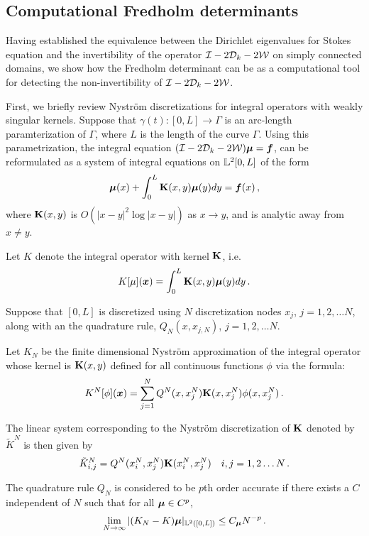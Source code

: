 \subsection{Computational Fredholm determinants}
Having established the equivalence between the Dirichlet eigenvalues
for Stokes equation and the invertibility of
the operator $\mathcal I - 2{\mathcal D}_{k} - 2{\mathcal W}$ on simply connected domains, we show how 
the Fredholm determinant can be as a computational tool for detecting
the non-invertibility of $\mathcal I - 2{\mathcal D}_{k} - 2{\mathcal W}$.

First, we briefly review Nystr\"{o}m discretizations for integral operators
with weakly singular kernels.
Suppose that $\gamma(t):[0,L] \to \Gamma$ is an arc-length
paramterization of $\Gamma$, where $L$ is the length of the
curve $\Gamma$.
Using this parametrization, the integral equation
$(\mathcal I - 2{\mathcal D}_{k} - 2{\mathcal W}){\boldsymbol \mu} = {\boldsymbol f}$, 
can be reformulated as a system of integral equations on 
${\mathbb L}^{2}[0,L]$ of the form 
\begin{equation}
{\boldsymbol \mu}(x) + \int_{0}^{L} {\mathbf K}(x,y) {\boldsymbol \mu}(y) dy = {\boldsymbol f}(x) \, , 
\end{equation}
where ${\mathbf K}(x,y)$ is $O(|x-y|^2 \log{|x-y|})$ as $x\to y$, and
is analytic away from $x\neq y$.

Let $K$ denote the integral operator with kernel ${\mathbf K}$, i.e.
\begin{equation}
K[\mu]({\boldsymbol x}) = \int_{0}^{L} {\mathbf K}(x,y) {\boldsymbol \mu}(y) dy \, .
\end{equation}


Suppose that $[0,L]$ is discretized using $N$ discretization
nodes $x_{j}$, $j=1,2,\ldots N$, along with an
the quadrature rule, $Q_{N}(x,x_{j,N})$, $j=1,2,\ldots N$.

Let $K_{N}$ be the finite dimensional Nystr\"{o}m approximation of
the integral operator whose kernel is ${\mathbf K}(x,y)$ defined for all
continuous functions $\phi$ via the formula:
\begin{equation}
K^{N}[\phi]({\boldsymbol x}) = \sum_{j=1}^{N} Q^{N}(x,x^{N}_{j})  
{\mathbf K}(x,x_{j}^{N}) \phi(x,x_{j}^{N}) \, .
\end{equation}

The linear system corresponding to the Nystr\"{o}m discretization
of ${\mathbf K}$ denoted by $\tilde{K}^{N}$ is then given by
\begin{equation}
\tilde{K}^{N}_{i,j} = Q^{N}(x_{i}^{N}, x_{j}^{N}) {\mathbf K}(x_{i}^{N}, x_{j}^{N})
\quad i,j=1,2\ldots N \, .
\end{equation}

\begin{definition}
The quadrature rule $Q_{N}$ is considered
to be $p$th order accurate if there exists a $C$ independent of $N$
such that for all ${\boldsymbol \mu} \in C^{p}$, 
\begin{equation}
\lim_{N\to \infty} |(K_{N} - K){\boldsymbol \mu}|_{{\mathbb L}^{2}([0,L])} \leq C_{{\boldsymbol \mu}} N^{-p} \, .
\end{equation}
\end{definition}

